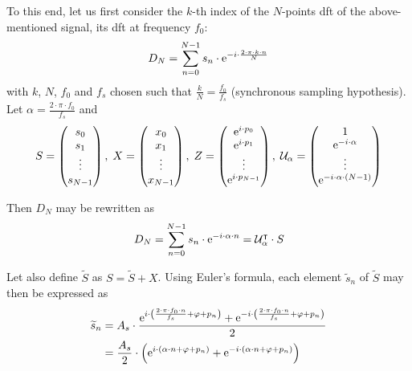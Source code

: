 To this end, let us first consider the $k$-th index of the $N$-points \gls{dft} of the above-mentioned signal\cite{cooley1969}, \ie{} its \gls{dft} at frequency $f_0$:
\begin{equation}
	D_N = \sum_{n=0}^{N-1} s_n \cdot \mathrm{e}^{-i \cdot \frac{2\cdot \pi \cdot k \cdot n}{N}}
\end{equation}
with $k$, $N$, $f_0$ and $f_s$ chosen such that $\frac{k}{N}=\frac{f_0}{f_s}$ (synchronous sampling hypothesis). Let $\alpha = \frac{2 \cdot \pi \cdot f_0}{f_s}$ and
\begin{equation}
	S = \begin{pmatrix} s_0 \\ s_1 \\ \vdots \\ s_{N-1} \end{pmatrix},\; X = \begin{pmatrix} x_0 \\ x_1 \\ \vdots \\ x_{N-1} \end{pmatrix},\;
	Z = \begin{pmatrix} \mathrm{e}^{i \cdot p_0} \\ \mathrm{e}^{i \cdot p_1} \\ \vdots \\ \mathrm{e}^{i \cdot p_{N-1}} \end{pmatrix},\; \mathcal{U}_{\alpha} = \begin{pmatrix} 1 \\ \mathrm{e}^{-i \cdot \alpha} \\ \vdots \\ \mathrm{e}^{-i \cdot \alpha \cdot (N-1)} \end{pmatrix}
\end{equation}

Then $D_N$ may be rewritten as
\begin{equation}
	D_N = \sum_{n=0}^{N-1} s_n \cdot \mathrm{e}^{-i \cdot \alpha \cdot n} = \mathcal{U}_{\alpha}^\intercal \cdot S
\end{equation}

Let also define $\widetilde{S}$ as $S = \widetilde{S} + X$. Using Euler's formula, each element $\widetilde{s}_n$ of $\widetilde{S}$ may then be expressed as
\begin{equation}
	\begin{aligned}
		\widetilde{s}_n &= A_s \cdot \frac{\mathrm{e}^{i \cdot \left( \frac{2\cdot \pi \cdot f_0 \cdot n}{f_s} + \varphi + p_n \right)} + \mathrm{e}^{- i \cdot \left( \frac{2\cdot \pi \cdot f_0 \cdot n}{f_s} + \varphi + p_n \right)}}{2} \\
		&= \frac{A_s}{2} \cdot \left(\mathrm{e}^{i\cdot \left( \alpha \cdot n + \varphi +  p_n \right)} + \mathrm{e}^{- i\cdot \left( \alpha \cdot n + \varphi + p_n \right)}\right)
	\end{aligned}
\end{equation}

